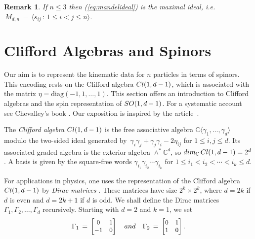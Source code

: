 \documentclass[english]{ourlematema}
\numberwithin{theorem}{section}
\newtheorem{remark}[theorem]{Remark}
\theoremstyle{definition}
\newcommand{\CC}{\mathbb{C}}
\begin{document}
\begin{remark} \label{rmk:maxideal}
If $n \leq 3$ then (\ref{eq:mandelideal}) is the maximal ideal, i.e.~$\,M_{d,n} \,=\,\langle s_{ij}\, : \, 1 \leq i < j \leq n \rangle$.
\end{remark}

\section{Clifford Algebras and Spinors}
\label{sec3}

Our aim is to represent the kinematic data
for  $n$ particles  in terms of spinors.
This encoding rests on the
Clifford algebra ${\rm Cl}(1,d-1)$,
which is associated with the matrix
$\eta=\mathrm{diag}(-1,1,\dots,1)$. 
This section offers an introduction to
Clifford algebras and the spin representation of ${\rm SO}(1,d-1)$.
For a systematic account see Chevalley's book \cite{Che}.
Our exposition is inspired by the article~\cite{RdT}.

The {\em Clifford algebra} ${\rm Cl}(1,d-1)$ is the
free associative algebra $\CC \langle \gamma_1,\ldots,\gamma_d \rangle$
modulo the two-sided ideal generated by 
$\,\gamma_i \gamma_j + \gamma_j \gamma_i - 2\eta_{ij}$ for $1 \leq i,j \leq d$.
Its associated graded algebra  is the exterior algebra $\wedge^* \CC^d$, so
${\rm dim}_\CC\, {\rm Cl}(1,d-1)  =  2^d$. A basis is given by
the square-free words $\gamma_{i_1} \gamma_{i_2} \cdots \gamma_{i_k}$
for $1 \leq i_1 < i_2 < \cdots < i_k \leq d$.

For applications in physics, one uses the representation of the Clifford algebra
${\rm Cl}(1,d-1)$ by {\em Dirac matrices} \cite[Section 4]{RdT}.
These matrices have size $2^k \times 2^k$, where
 $d=2k$ if $d$ is even and $d=2k+1$ if $d$ is odd. 
 We shall define the Dirac matrices 
  $\Gamma_1, \Gamma_2, \ldots, \Gamma_d$   recursively.
Starting with $d=2$ and $k=1$, we set
\begin{equation}
\label{eq:Omega1}     \Gamma_1 \, = \,
\begin{small}
    \begin{bmatrix}
        0 & 1 \\
        -1 & 0 \\
    \end{bmatrix} \end{small} \quad {\rm and} \quad
    \Gamma_2 \, = \, \begin{small}
    \begin{bmatrix}
        0 & 1 \\
        1 & 0
    \end{bmatrix}. \end{small}
\end{equation}
\end{document}
